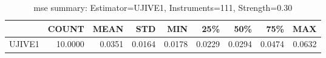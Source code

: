 \begin{table}[ht]
\centering
\caption{mse summary: Estimator=UJIVE1, Instruments=111, Strength=0.30}
\begin{tabular}{lrrrrrrrr}
\toprule
 & COUNT & MEAN & STD & MIN & 25\% & 50\% & 75\% & MAX \\
\midrule
UJIVE1 & 10.0000 & 0.0351 & 0.0164 & 0.0178 & 0.0229 & 0.0294 & 0.0474 & 0.0632 \\
\bottomrule
\end{tabular}
\end{table}
